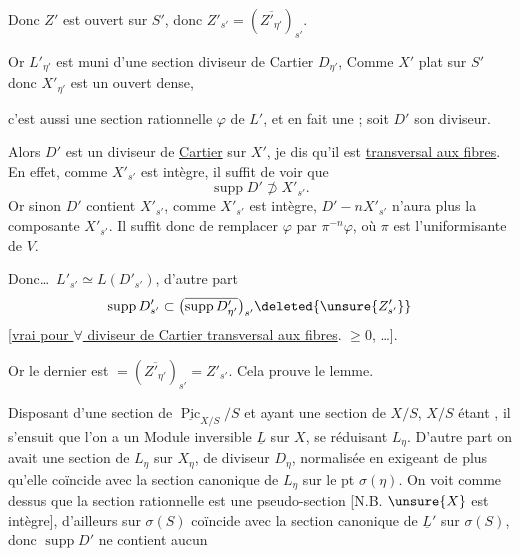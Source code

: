 Donc $Z'$ est ouvert sur $S'$, donc $Z'_{s'}=(\overline{Z'_{\eta'}})_{s'}$.

Or $L'_{\eta'}$ est muni d'une section    diviseur de Cartier $D_{\eta'}$,  Comme $X'$ plat sur $S'$ donc $X'_{\eta'}$ est un ouvert dense,

c'est aussi une section rationnelle $\varphi$ de $L'$, et en fait une   ; soit $D'$ son diviseur.

Alors $D'$ est un diviseur de \uline{Cartier}  sur $X'$,  je dis qu'il est \uline{transversal aux fibres}.  En effet, comme $X'_{s'}$ est intègre, il suffit de voir que
\[
 \operatorname{supp}D'\not\supset X'_{s'}.
\]
Or sinon  $D'$ contient    $X'_{s'}$,  comme $X'_{s'}$ est intègre, $D'-nX'_{s'}$  n'aura plus la composante $X'_{s'}$. Il suffit donc de remplacer $\varphi$ par $\pi^{-n}\varphi$, où $\pi$ est l'uniformisante de $V$.


Donc\ldots\ $L'_{s'}\simeq L(D'_{s'})$, d'autre part
\[
 \operatorname{supp}D'_{s'}\subset\bigl(\overline{\operatorname{supp}D'_{\eta'}}\bigr)_{s'}\deleted{\unsure{Z'_{s'}}}
\]
[\uline{vrai pour $\forall$ diviseur de Cartier transversal aux fibres}.  $\geq0$, \ldots].

Or le dernier est $=(\overline{Z'_{\eta'}})_{s'}=Z'_{s'}$. Cela prouve le lemme.

Disposant d'une section de $\underline{\operatorname{Pic}}_{X/S}/S$ et ayant une section de $X/S$, $X/S$ étant , il s'ensuit que l'on a un Module inversible $\underline L$ sur $X$, se réduisant  $L_\eta$. D'autre part on avait  une section de $L_\eta$ sur $X_\eta$, de diviseur $D_\eta$, normalisée en exigeant de plus qu'elle coïncide avec la section canonique de $L_\eta$ sur le pt $\sigma(\eta)$. On voit comme dessus que la section  rationnelle est une pseudo-section [N.B. $\unsure{X}$ est intègre],  d'ailleurs sur $\sigma(S)$   coïncide avec la section canonique de $\underline L'$ sur $\sigma(S)$, donc  $\operatorname{supp}D'$ ne contient aucun

